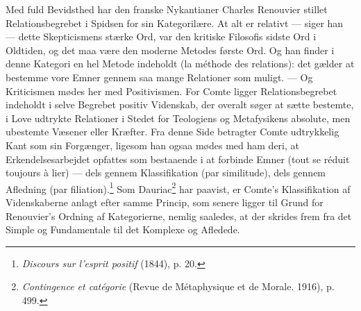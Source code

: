\documentclass[12pt]{article}
\newcommand{\opage}[1]{\marginnote{\footnotesize\textit{[#1]}}}
\begin{document}
Med fuld Bevidsthed har den franske Nykantianer Charles Renouvier stillet
Relationsbegrebet i Spidsen for
\opage{13} \setcounter{footnote}{0}
sin Kategorilære. At alt er relativt --- siger han --- dette Skepticismens
stærke Ord, var den kritiske Filosofis sidste Ord i Oldtiden, og det maa være
den moderne Metodes første Ord. Og han finder i denne Kategori en hel Metode
indeholdt (la méthode des relations): det gælder at bestemme vore Emner
gennem saa mange Relationer som muligt. --- Og Kriticismen mødes her med
Positivismen. For Comte ligger Relationsbegrebet indeholdt i selve Begrebet
positiv Videnskab, der overalt søger at sætte bestemte, i Love udtrykte
Relationer i Stedet for Teologiens og Metafysikens absolute, men ubestemte
Væsener eller Kræfter.
Fra denne Side betragter Comte udtrykkelig Kant som sin Forgænger, ligesom han
ogsaa mødes med ham deri, at Erkendelsesarbejdet opfattes som bestaaende i at
forbinde Emner (tout se réduit toujours à lier) --- dels gennem Klassifikation
(par similitude), dels gennem Afledning (par
filiation).\footnote{\textit{Discours sur l'esprit positif} (1844), p. 20.}
Som Dauriac\footnote{\textit{Contingence et catégorie} (Revue de Métaphysique
et de Morale. 1916), p. 499.} har paavist, er Comte's Klassifikation af
Videnskaberne anlagt efter samme Princip, som senere ligger til Grund for
Renouvier's Ordning af Kategorierne, nemlig saaledes, at der skrides frem fra
det Simple og Fundamentale til det Komplexe og Afledede.
\end{document}
